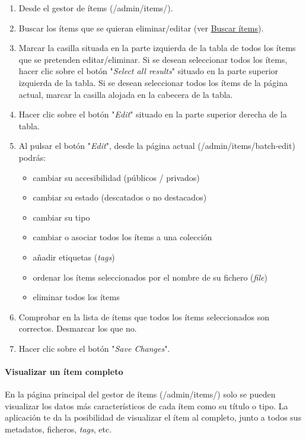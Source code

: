 \documentclass[
]{article}
\providecommand{\tightlist}{%
  \setlength{\itemsep}{0pt}\setlength{\parskip}{0pt}}
\begin{document}
\begin{enumerate}
\def\labelenumi{\arabic{enumi}.}
\tightlist
\item
  Desde el gestor de ítems ({/admin/items/}).
\item
  Buscar los ítems que se quieran eliminar/editar (ver
  \protect\hyperlink{buscar-uxedtems}{Buscar ítems}).
\item
  Marcar la casilla situada en la parte izquierda de la tabla de todos
  los ítems que se pretenden editar/eliminar. Si se desean seleccionar
  todos los ítems, hacer clic sobre el botón "\emph{Select all results}"
  situado en la parte superior izquierda de la tabla. Si se desean
  seleccionar todos los ítems de la página actual, marcar la casilla
  alojada en la cabecera de la tabla.
\item
  Hacer clic sobre el botón "\emph{Edit}" situado en la parte superior
  derecha de la tabla.
\item
  Al pulsar el botón "\emph{Edit}", desde la página actual
  ({/admin/items/batch-edit}) podrás:

  \begin{itemize}
  \tightlist
  \item
    cambiar su accesibilidad (públicos / privados)
  \item
    cambiar su estado (descatados o no destacados)
  \item
    cambiar su tipo
  \item
    cambiar o asociar todos los ítems a una colección
  \item
    añadir etiquetas (\emph{tags})
  \item
    ordenar los ítems seleccionados por el nombre de su fichero
    (\emph{file})
  \item
    eliminar todos los ítems
  \end{itemize}
\item
  Comprobar en la lista de ítems que todos los ítems seleccionados son
  correctos. Desmarcar los que no.
\item
  Hacer clic sobre el botón "\emph{Save Changes}".
\end{enumerate}

\hypertarget{visualizar-un-uxedtem-completo}{%
\paragraph{Visualizar un ítem
completo}\label{visualizar-un-uxedtem-completo}}

En la página principal del gestor de ítems ({/admin/items/}) solo se
pueden visualizar los datos más característicos de cada ítem como su
título o tipo. La aplicación te da la posibilidad de visualizar el ítem
al completo, junto a todos sus metadatos, ficheros, \emph{tags}, etc.
\end{document}
